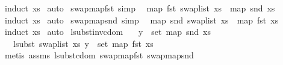 \begin{isabellebody}
%
\isadelimproof
%
\endisadelimproof
%
\isatagproof
{}\isamarkupfalse%
\ {\isacharparenleft}{\kern0pt}induct\ xs{\isacharparenright}{\kern0pt}\isanewline
{}\isamarkupfalse%
\ auto%
\endisatagproof
{\isafoldproof}%
%
\isadelimproof
\isanewline
%
\endisadelimproof
\isanewline
{}\isamarkupfalse%
\ swap{\isacharunderscore}{\kern0pt}map{\isacharunderscore}{\kern0pt}fst\ {\isacharbrackleft}{\kern0pt}simp{\isacharbrackright}{\kern0pt}{\isacharcolon}{\kern0pt}\isanewline
\ \ {\isachardoublequoteopen}map\ fst\ {\isacharparenleft}{\kern0pt}swap{\isacharunderscore}{\kern0pt}list\ xs{\isacharparenright}{\kern0pt}\ {\isacharequal}{\kern0pt}\ map\ snd\ xs{\isachardoublequoteclose}\isanewline
%
\isadelimproof
%
\endisadelimproof
%
\isatagproof
{}\isamarkupfalse%
\ {\isacharparenleft}{\kern0pt}induct\ xs{\isacharparenright}{\kern0pt}\isanewline
{}\isamarkupfalse%
\ auto%
\endisatagproof
{\isafoldproof}%
%
\isadelimproof
\isanewline
%
\endisadelimproof
\isanewline
\isanewline
{}\isamarkupfalse%
\ swap{\isacharunderscore}{\kern0pt}map{\isacharunderscore}{\kern0pt}snd\ {\isacharbrackleft}{\kern0pt}simp{\isacharbrackright}{\kern0pt}{\isacharcolon}{\kern0pt}\isanewline
\ \ {\isachardoublequoteopen}map\ snd\ {\isacharparenleft}{\kern0pt}swap{\isacharunderscore}{\kern0pt}list\ xs{\isacharparenright}{\kern0pt}\ {\isacharequal}{\kern0pt}\ map\ fst\ xs{\isachardoublequoteclose}\isanewline
%
\isadelimproof
%
\endisadelimproof
%
\isatagproof
{}\isamarkupfalse%
\ {\isacharparenleft}{\kern0pt}induct\ xs{\isacharparenright}{\kern0pt}\isanewline
{}\isamarkupfalse%
\ auto%
\endisatagproof
{\isafoldproof}%
%
\isadelimproof
\isanewline
%
\endisadelimproof
\isanewline
\isanewline
{}\isamarkupfalse%
\ lsubst{\isacharunderscore}{\kern0pt}inv{\isacharunderscore}{\kern0pt}cdom{\isacharcolon}{\kern0pt}\isanewline
\ \ \ {\isachardoublequoteopen}y\ {\isasymin}\ set\ {\isacharparenleft}{\kern0pt}map\ snd\ xs{\isacharparenright}{\kern0pt}{\isachardoublequoteclose}\isanewline
\ \ \ {\isachardoublequoteopen}lsubst\ {\isacharparenleft}{\kern0pt}swap{\isacharunderscore}{\kern0pt}list\ xs{\isacharparenright}{\kern0pt}\ y\ {\isasymin}\ set\ {\isacharparenleft}{\kern0pt}map\ fst\ xs{\isacharparenright}{\kern0pt}{\isachardoublequoteclose}\isanewline
%
\isadelimproof
%
\endisadelimproof
%
\isatagproof
{}\isamarkupfalse%
\ {\isacharparenleft}{\kern0pt}metis\ assms\ lsubst{\isacharunderscore}{\kern0pt}cdom\ swap{\isacharunderscore}{\kern0pt}map{\isacharunderscore}{\kern0pt}fst\ swap{\isacharunderscore}{\kern0pt}map{\isacharunderscore}{\kern0pt}snd{\isacharparenright}{\kern0pt}%

\end{isabellebody}
